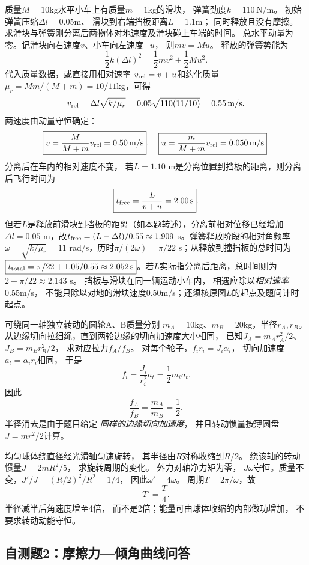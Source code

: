 \problemtext 质量$M=10$kg水平小车上有质量$m=1$kg的滑块，
弹簧劲度$k=110\,\mathrm{N/m}$。
初始弹簧压缩$\Delta l=0.05$m、
滑块到右端挡板距离$L=1.1$m；
同时释放且没有摩擦。
求滑块与弹簧刚分离后两物体对地速度及滑块碰上车端的时间。
\workings
总水平动量为零。记滑块向右速度$v$、小车向左速度$-u$，
则$mv=Mu$。
释放的弹簧势能为
\[
\frac12k(\Delta l)^2
=\frac12mv^2+\frac12Mu^2.
\]
代入质量数据，或直接用相对速率
$v_{\rm rel}=v+u$和约化质量
$\mu_r=Mm/(M+m)=10/11$kg，可得
\[
v_{\rm rel}=\Delta l\sqrt{k/\mu_r}
=0.05\sqrt{110(11/10)}=0.55\,\mathrm{m/s}.
\]
两速度由动量守恒确定：
\[
\boxed{v=\frac{M}{M+m}v_{\rm rel}=0.50\,\mathrm{m/s}},
\quad
\boxed{u=\frac{m}{M+m}v_{\rm rel}=0.050\,\mathrm{m/s}}.
\]
分离后在车内的相对速度不变，
若$L=1.10$ m是分离位置到挡板的距离，则分离后飞行时间为
\[
\boxed{t_{\rm free}=\frac L{v+u}=2.00\,\mathrm s}.
\]
但若$L$是释放前滑块到挡板的距离（如本题转述），分离前相对位移已经增加$\Delta l=0.05$ m，故$t_{\rm free}=(L-\Delta l)/0.55\approx1.909$ s。弹簧释放阶段的相对角频率$\omega=\sqrt{k/\mu_r}=11$ rad/s，历时$\pi/(2\omega)=\pi/22$ s；从释放到撞挡板的总时间为$\boxed{t_{\rm total}=\pi/22+1.05/0.55\approx2.052\,\mathrm s}$。若$L$实际指分离后距离，总时间则为$2+\pi/22\approx2.143$ s。
\crosscheck 挡板与滑块在同一辆运动小车内，
相遇应除以\emph{相对速率}0.55m/s，
不能只除以对地的滑块速度0.50m/s；还须核原图$L$的起点及题问计时起点。

\problemtext 可绕同一轴独立转动的圆轮A、B质量分别
$m_A=10$kg、$m_B=20$kg，半径$r_A,r_B$。
从边缘切向拉细绳，直到两轮边缘的切向加速度大小相同，
已知$J_A=m_Ar_A^2/2$、$J_B=m_Br_B^2/2$，
求对应拉力$f_A/f_B$。
\workings
对每个轮子，$f_ir_i=J_i\alpha_i$，
切向加速度$a_t=\alpha_ir_i$相同，
于是
\[
f_i=\frac{J_i}{r_i^2}a_t=\frac12m_i a_t.
\]
因此
\[
\boxed{\frac{f_A}{f_B}=\frac{m_A}{m_B}=\frac12}.
\]
\crosscheck 半径消去是由于题目给定
\emph{同样的边缘切向加速度}，
并且转动惯量按薄圆盘$J=mr^2/2$计算。

\problemtext 均匀球体绕直径经光滑轴匀速旋转，
其半径由$R$对称收缩到$R/2$。
绕该轴的转动惯量$J=2mR^2/5$，
求旋转周期的变化。
\workings
外力对轴净力矩为零，
$J\omega$守恒。质量不变，$J'\!/J=(R/2)^2/R^2=1/4$，
因此$\omega'=4\omega$。
周期$T=2\pi/\omega$，故
\[
\boxed{T'=\frac T4}.
\]
\crosscheck 半径减半后角速度增至4倍，
而不是2倍；能量可由球体收缩的内部做功增加，
不要求转动动能守恒。

\subsection{自测题2：摩擦力—倾角曲线问答}

